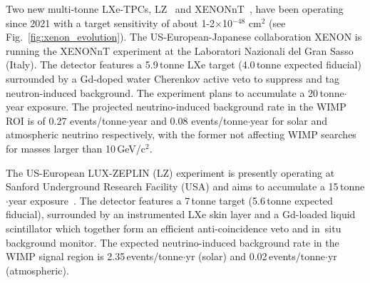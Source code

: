 
Two new multi-tonne LXe-TPCs, LZ~\cite{AKERIB201804} and XENONnT~\cite{XENON:2020kmp}, have been operating since 2021 with a target sensitivity of about 1-2$\times$10$^{-48}$ cm$^2$ (see Fig.~\ref{fig:xenon_evolution}).
The US-European-Japanese collaboration XENON is running the XENONnT experiment at the Laboratori Nazionali del Gran Sasso (Italy). The detector features a 5.9\,tonne LXe target (4.0\,tonne expected fiducial) surrounded by a Gd-doped water Cherenkov active veto to suppress and tag neutron-induced background.
The experiment plans to accumulate a 20\,tonne$\cdot$year exposure. The projected neutrino-induced background rate in the WIMP ROI is of 0.27 events/tonne$\cdot$year and 0.08 events/tonne$\cdot$year for solar and atmospheric neutrino respectively, with the former not affecting WIMP searches for masses larger than 10\,GeV/c$^2$. 

The US-European LUX-ZEPLIN (LZ) experiment is presently operating at Sanford Underground Research Facility (USA) and aims to accumulate a 15\,tonne$\cdot$year exposure~\cite{AKERIB201804}. The detector features a 7\,tonne target (5.6\,tonne expected fiducial), surrounded by an instrumented LXe skin layer and a Gd-loaded liquid scintillator which together form an efficient anti-coincidence veto and in~situ background monitor. 
The expected neutrino-induced background rate in the WIMP signal region is 2.35\,events/tonne$\cdot$yr (solar) and 0.02\,events/tonne$\cdot$yr (atmospheric).

